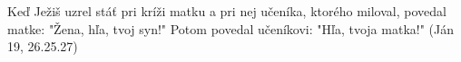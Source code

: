 Keď Ježiš uzrel stáť pri kríži matku  a pri nej učeníka, ktorého miloval, povedal matke: "Žena, hľa, tvoj syn!" Potom povedal učeníkovi: "Hľa, tvoja matka!" (Ján 19, 26.25.27)
